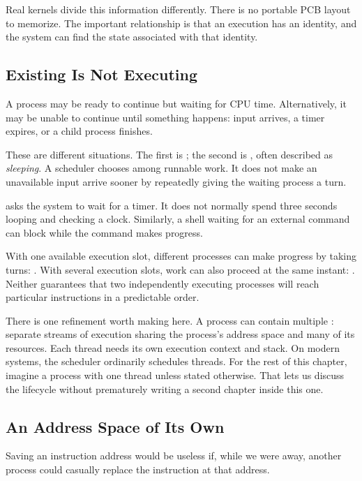 \documentclass[11pt]{article}
\begin{document}
Real kernels divide this information differently.
There is no portable PCB layout to memorize.
The important relationship is that an execution has an identity, and the system can find the state associated with that identity.

\subsection{Existing Is Not Executing}

A process may be ready to continue but waiting for CPU time.
Alternatively, it may be unable to continue until something happens: input arrives, a timer expires, or a child process finishes.

These are different situations.
The first is ; the second is , often described as \emph{sleeping}.
A scheduler chooses among runnable work.
It does not make an unavailable input arrive sooner by repeatedly giving the waiting process a turn.

 asks the system to wait for a timer.
It does not normally spend three seconds looping and checking a clock.
Similarly, a shell waiting for an external command can block while the command makes progress.

With one available execution slot, different processes can make progress by taking turns: .
With several execution slots, work can also proceed at the same instant: .
Neither guarantees that two independently executing processes will reach particular instructions in a predictable order.

There is one refinement worth making here.
A process can contain multiple : separate streams of execution sharing the process's address space and many of its resources.
Each thread needs its own execution context and stack.
On modern systems, the scheduler ordinarily schedules threads.
For the rest of this chapter, imagine a process with one thread unless stated otherwise.
That lets us discuss the lifecycle without prematurely writing a second chapter inside this one.

\subsection{An Address Space of Its Own}

Saving an instruction address would be useless if, while we were away, another process could casually replace the instruction at that address.
\end{document}
